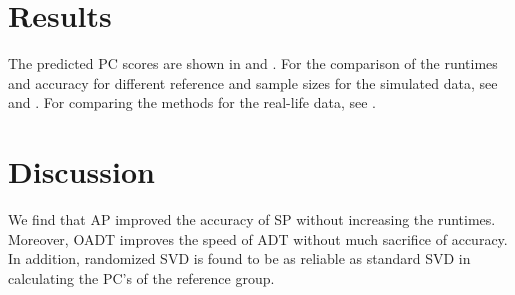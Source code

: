 \documentclass{article}
\begin{document}
\section{Results}

The predicted PC scores are shown in  and .
For the comparison of the runtimes and accuracy for different reference and sample sizes for the simulated data,
see  and .
For comparing the methods for the real-life data, see .



\section{Discussion}

We find that AP improved the accuracy of SP without increasing the runtimes.
Moreover, OADT improves the speed of ADT without much sacrifice of accuracy.
In addition, randomized SVD is found to be as reliable as standard SVD in
calculating the PC's of the reference group.

\newpage
\end{document}
